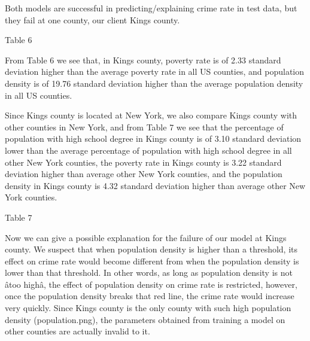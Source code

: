\documentclass[preprint,12pt,3p]{elsarticle}
\begin{document}
Both models are successful in predicting/explaining crime rate in test data, but they fail at one county, our client Kings county.

\begin{center}
      \caption{Table 6}
\end{center}

From Table 6 we see that, in Kings county, poverty rate is of 2.33 standard deviation higher than the average poverty rate in all US counties, and population density is of 19.76 standard deviation higher than the average population density in all US counties.

Since Kings county is located at New York, we also compare Kings county with other counties in New York, and from Table 7 we see that the percentage of population with high school degree in Kings county is of 3.10 standard deviation lower than the average percentage of population with high school degree in all other New York counties, the poverty rate in Kings county is 3.22 standard deviation higher than average other New York counties, and the population density in Kings county is 4.32 standard deviation higher than average other New York counties.

\begin{center}
      \caption{Table 7}
\end{center}


Now we can give a possible explanation for the failure of our model at Kings county. We suspect that when population density is higher than a threshold, its effect on crime rate would become different from when the population density is lower than that threshold. In other words, as long as population density is not âtoo highâ, the effect of population density on crime rate is restricted, however, once the population density breaks that red line, the crime rate would increase very quickly. Since Kings county is the only county with such high population density (population.png), the parameters obtained from training a model on other counties are actually invalid to it.
\end{document}
